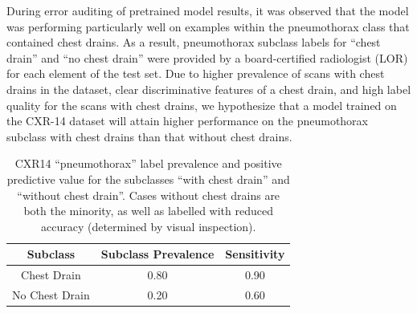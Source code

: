 \documentclass{article}
\begin{document}
During error auditing of pretrained model results, it was observed that the model was performing particularly well on examples within the pneumothorax class that contained chest drains. 
 As a result, pneumothorax subclass labels for ``chest drain'' and ``no chest drain'' were provided by a board-certified radiologist (LOR) for each element of the test set.  
 Due to higher prevalence of scans with chest drains in the dataset, clear discriminative features of a chest drain, and high label quality for the scans with chest drains, we hypothesize that a model trained on the CXR-14 dataset will attain higher performance on the pneumothorax subclass with chest drains than that without chest drains.  
 
 \begin{table}[]
 \centering
\begin{tabular}{|c|c|c|}
\hline
 Subclass & Subclass Prevalence & Sensitivity \\
 \hline
 Chest Drain & 0.80 & 0.90   \\
 No Chest Drain & 0.20 & 0.60 \\
 \hline    
\end{tabular}
\caption{ CXR14 ``pneumothorax'' label prevalence and positive predictive value for the subclasses ``with chest drain'' and ``without chest drain''. Cases without chest drains are both the minority, as well as labelled with reduced accuracy (determined by visual inspection).}
\label{tab:cxr14-1}
\vspace{-4mm}
\end{table}
\end{document}
